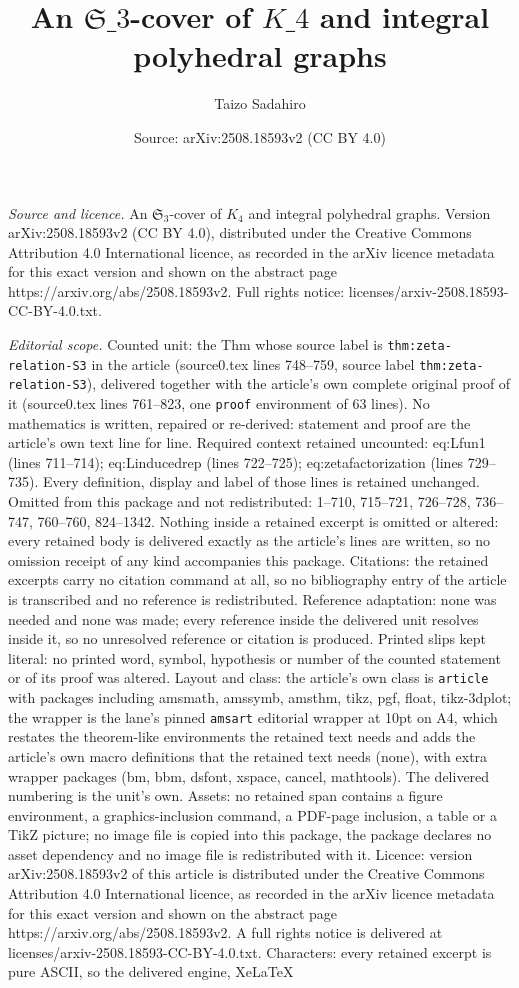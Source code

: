 \documentclass[10pt,a4paper]{amsart}
\title[An ${\mathfrak S}\_3$-cover of $K\_4$ and integral polyhedral ]{An ${\mathfrak S}\_3$-cover of $K\_4$ and integral polyhedral graphs}
\author{Taizo Sadahiro}
\date{Source: arXiv:2508.18593v2 (CC BY 4.0)}
\begin{document}
\maketitle

\noindent\emph{Source and licence.} An ${\mathfrak S}_3$-cover of $K_4$ and integral polyhedral graphs. Version arXiv:2508.18593v2 (CC BY 4.0), distributed under the Creative Commons Attribution 4.0 International licence, as recorded in the arXiv licence metadata for this exact version and shown on the abstract page https://arxiv.org/abs/2508.18593v2. Full rights notice: licenses/arxiv-2508.18593-CC-BY-4.0.txt.\par\smallskip

\noindent\textit{Editorial scope.} Counted unit: the Thm whose source label is \texttt{thm:zeta-relation-S3} in the article (source0.tex lines 748--759, source label \texttt{thm:zeta-relation-S3}), delivered together with the article's own complete original proof of it (source0.tex lines 761--823, one \texttt{proof} environment of 63 lines). No mathematics is written, repaired or re-derived: statement and proof are the article's own text line for line. Required context retained uncounted: eq:Lfun1 (lines 711--714); eq:Linducedrep (lines 722--725); eq:zetafactorization (lines 729--735). Every definition, display and label of those lines is retained unchanged. Omitted from this package and not redistributed: 1--710, 715--721, 726--728, 736--747, 760--760, 824--1342. Nothing inside a retained excerpt is omitted or altered: every retained body is delivered exactly as the article's lines are written, so no omission receipt of any kind accompanies this package. Citations: the retained excerpts carry no citation command at all, so no bibliography entry of the article is transcribed and no reference is redistributed. Reference adaptation: none was needed and none was made; every reference inside the delivered unit resolves inside it, so no unresolved reference or citation is produced. Printed slips kept literal: no printed word, symbol, hypothesis or number of the counted statement or of its proof was altered. Layout and class: the article's own class is \texttt{article} with packages including amsmath, amssymb, amsthm, tikz, pgf, float, tikz-3dplot; the wrapper is the lane's pinned \texttt{amsart} editorial wrapper at 10pt on A4, which restates the theorem-like environments the retained text needs and adds the article's own macro definitions that the retained text needs (none), with extra wrapper packages (bm, bbm, dsfont, xspace, cancel, mathtools). The delivered numbering is the unit's own. Assets: no retained span contains a figure environment, a graphics-inclusion command, a PDF-page inclusion, a table or a TikZ picture; no image file is copied into this package, the package declares no asset dependency and no image file is redistributed with it. Licence: version arXiv:2508.18593v2 of this article is distributed under the Creative Commons Attribution 4.0 International licence, as recorded in the arXiv licence metadata for this exact version and shown on the abstract page https://arxiv.org/abs/2508.18593v2. A full rights notice is delivered at licenses/arxiv-2508.18593-CC-BY-4.0.txt. Characters: every retained excerpt is pure ASCII, so the delivered engine, XeLaTeX 
\end{document}
